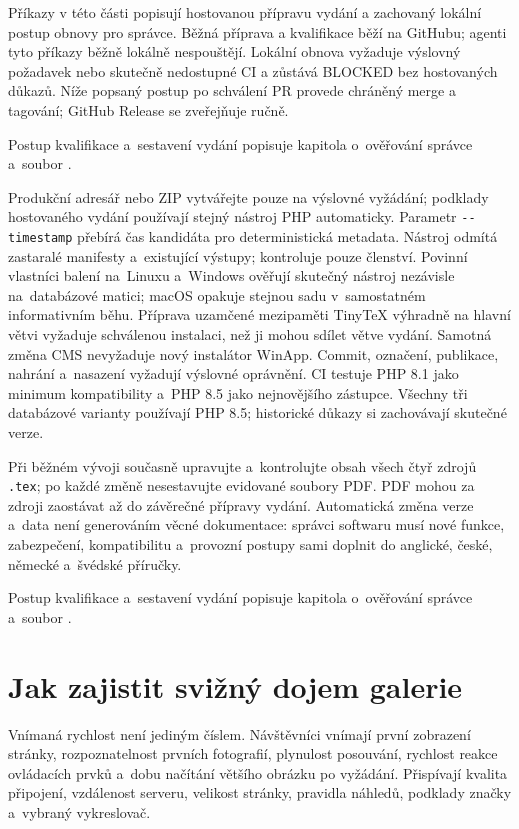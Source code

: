 \documentclass[11pt,a4paper]{article}
\newcommand{\filepath}[1]{\path{#1}}
\newcommand{\codeword}[1]{\nolinkurl{#1}}
\begin{document}
Příkazy v této části popisují hostovanou přípravu vydání a zachovaný lokální
postup obnovy pro správce. Běžná příprava a kvalifikace běží na GitHubu; agenti
tyto příkazy běžně lokálně nespouštějí. Lokální obnova vyžaduje výslovný
požadavek nebo skutečně nedostupné CI a zůstává BLOCKED bez hostovaných důkazů.
Níže popsaný postup po schválení PR provede chráněný merge a tagování; GitHub
Release se zveřejňuje ručně.

Postup kvalifikace a~sestavení vydání popisuje kapitola o~ověřování správce
a~soubor \filepath{RELEASE.md}.

Produkční adresář nebo ZIP vytvářejte pouze na výslovné vyžádání; podklady
hostovaného vydání používají stejný nástroj PHP automaticky. Parametr
\codeword{--timestamp} přebírá čas kandidáta pro deterministická metadata.
Nástroj odmítá zastaralé manifesty a~existující výstupy;
\filepath{scripts/release_files.php} kontroluje pouze členství. Povinní
vlastníci balení na~Linuxu a~Windows ověřují skutečný nástroj nezávisle
na~databázové matici; macOS opakuje stejnou sadu v~samostatném informativním
běhu. Příprava uzamčené mezipaměti TinyTeX výhradně na hlavní větvi vyžaduje
schválenou instalaci, než ji mohou sdílet větve vydání. Samotná změna CMS
nevyžaduje nový instalátor WinApp. Commit, označení, publikace, nahrání
a~nasazení vyžadují výslovné oprávnění. CI testuje PHP 8.1 jako minimum
kompatibility a~PHP 8.5 jako nejnovějšího zástupce. Všechny tři databázové
varianty používají PHP 8.5; historické důkazy si zachovávají skutečné verze.

Při běžném vývoji současně upravujte a~kontrolujte obsah všech čtyř zdrojů
\codeword{.tex}; po každé změně nesestavujte evidované soubory PDF. PDF mohou za
zdroji zaostávat až do závěrečné přípravy vydání. Automatická změna verze a~data
není generováním věcné dokumentace: správci softwaru musí nové funkce,
zabezpečení, kompatibilitu a~provozní postupy sami doplnit do anglické, české,
německé a~švédské příručky.

Postup kvalifikace a~sestavení vydání popisuje kapitola o~ověřování správce
a~soubor \filepath{RELEASE.md}.

\section{Jak zajistit svižný dojem galerie}
\label{sec:performance}

Vnímaná rychlost není jediným číslem. Návštěvníci vnímají první zobrazení
stránky, rozpoznatelnost prvních fotografií, plynulost posouvání, rychlost
reakce ovládacích prvků a~dobu načítání většího obrázku po vyžádání. Přispívají
kvalita připojení, vzdálenost serveru, velikost stránky, pravidla náhledů,
podklady značky a~vybraný vykreslovač.
\end{document}
